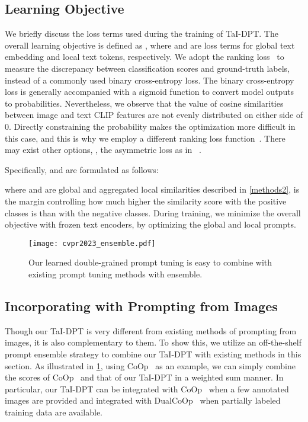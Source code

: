 \documentclass[10pt,twocolumn,letterpaper]{article}
\begin{document}
\subsection{Learning Objective}
\label{methods3}
We briefly discuss the loss terms used during the training of TaI-DPT.
The overall learning objective is defined as ,
where  and  are loss terms for global text embedding and local text tokens, respectively.
We adopt the ranking loss~\cite{rankingloss} to measure the discrepancy between classification scores and ground-truth labels, instead of a commonly used binary cross-entropy loss.
The binary cross-entropy loss is generally accompanied with a sigmoid function  to convert model outputs to probabilities. 
Nevertheless, we observe that the value of cosine similarities between image and text CLIP features  are not evenly distributed on either side of 0. 
Directly constraining the probability  makes the optimization more difficult in this case, and this is why we employ a different ranking loss function~\cite{rankingloss}.
There may exist other options, \eg, the asymmetric loss as in ~\cite{dualcoop}.


Specifically,  and  are formulated as follows:

\noindent where  and  are global and aggregated local similarities described in \cref{methods2},  is the margin controlling how much higher the similarity score with the positive classes is than with the negative classes. 
During training, we minimize the overall objective  with frozen text encoders, by optimizing the global and local prompts.


\begin{figure}
  \centering
\texttt{[image: cvpr2023\_ensemble.pdf]}

  \caption{Our learned double-grained prompt tuning is easy to combine with existing prompt tuning methods with ensemble.}
  \label{fig:ensemble}
\end{figure}

\subsection{Incorporating with Prompting from Images}
\label{methods4}
Though our TaI-DPT is very different from existing methods of prompting from images, it is also complementary to them. 
To show this, we utilize an off-the-shelf prompt ensemble strategy to combine our TaI-DPT with existing methods in this section.
As illustrated in \cref{fig:ensemble}, using CoOp~\cite{coop} as an example, we can simply combine the scores of CoOp~\cite{coop} and that of our TaI-DPT in a weighted sum manner. 
In particular, our TaI-DPT can be integrated with CoOp~\cite{coop} when a few annotated images are provided and integrated with DualCoOp~\cite{dualcoop} when partially labeled training data are available.
\end{document}
